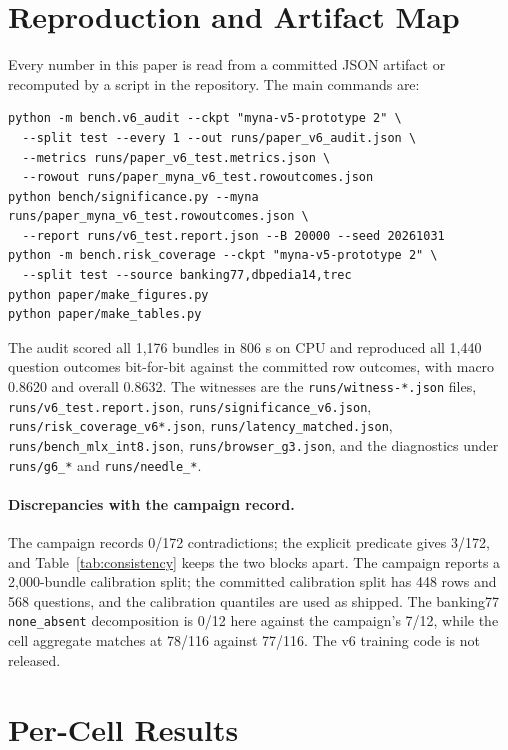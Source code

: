 
\appendix

\section{Reproduction and Artifact Map}
\label{app:extra}

Every number in this paper is read from a committed JSON artifact or recomputed by a script in the repository. The main commands are:

{\footnotesize
\begin{verbatim}
python -m bench.v6_audit --ckpt "myna-v5-prototype 2" \
  --split test --every 1 --out runs/paper_v6_audit.json \
  --metrics runs/paper_v6_test.metrics.json \
  --rowout runs/paper_myna_v6_test.rowoutcomes.json
python bench/significance.py --myna runs/paper_myna_v6_test.rowoutcomes.json \
  --report runs/v6_test.report.json --B 20000 --seed 20261031
python -m bench.risk_coverage --ckpt "myna-v5-prototype 2" \
  --split test --source banking77,dbpedia14,trec
python paper/make_figures.py
python paper/make_tables.py
\end{verbatim}
}

The audit scored all 1{,}176 bundles in 806 s on CPU and reproduced all 1{,}440 question outcomes bit-for-bit against the committed row outcomes, with macro 0.8620 and overall 0.8632. The witnesses are the \texttt{runs/witness-*.json} files, \texttt{runs/v6\_test.report.json}, \texttt{runs/significance\_v6.json}, \texttt{runs/risk\_coverage\_v6*.json}, \texttt{runs/latency\_matched.json}, \texttt{runs/bench\_mlx\_int8.json}, \texttt{runs/browser\_g3.json}, and the diagnostics under \texttt{runs/g6\_*} and \texttt{runs/needle\_*}.

\paragraph{Discrepancies with the campaign record.}
The campaign records 0/172 contradictions; the explicit predicate gives 3/172, and Table~\ref{tab:consistency} keeps the two blocks apart. The campaign reports a 2{,}000-bundle calibration split; the committed calibration split has 448 rows and 568 questions, and the calibration quantiles are used as shipped. The banking77 \texttt{none\_absent} decomposition is 0/12 here against the campaign's 7/12, while the cell aggregate matches at 78/116 against 77/116. The v6 training code is not released.

\section{Per-Cell Results}
\label{app:cells}

